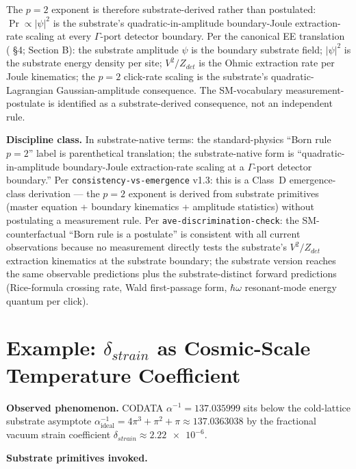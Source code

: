 The $p = 2$ exponent is therefore substrate-derived rather than postulated: $\Pr \propto |\psi|^2$ is the substrate's quadratic-in-amplitude boundary-Joule extraction-rate scaling at every $\Gamma$-port detector boundary. Per the canonical EE translation ( \S 4;  Section B): the substrate amplitude $\psi$ is the boundary substrate field; $|\psi|^2$ is the substrate energy density per site; $V^2/Z_{det}$ is the Ohmic extraction rate per Joule kinematics; the $p = 2$ click-rate scaling is the substrate's quadratic-Lagrangian Gaussian-amplitude consequence. The SM-vocabulary measurement-postulate is identified as a substrate-derived consequence, not an independent rule.

\textbf{Discipline class.} In substrate-native terms: the standard-physics ``Born rule $p=2$'' label is parenthetical translation; the substrate-native form is ``quadratic-in-amplitude boundary-Joule extraction-rate scaling at a $\Gamma$-port detector boundary.'' Per \texttt{consistency-vs-emergence} v1.3: this is a Class~D emergence-class derivation --- the $p = 2$ exponent is derived from substrate primitives (master equation + boundary kinematics + amplitude statistics) without postulating a measurement rule. Per \texttt{ave-discrimination-check}: the SM-counterfactual ``Born rule is a postulate'' is consistent with all current observations because no measurement directly tests the substrate's $V^2/Z_{det}$ extraction kinematics at the substrate boundary; the substrate version reaches the same observable predictions plus the substrate-distinct forward predictions (Rice-formula crossing rate, Wald first-passage form, $\hbar\omega$ resonant-mode energy quantum per click).

\section{Example: $\delta_{strain}$ as Cosmic-Scale Temperature Coefficient}
\label{sec:vol9_app_delta_strain_cosmic_tcc}

\textbf{Observed phenomenon.} CODATA $\alpha^{-1} = 137.035999$ sits below the cold-lattice substrate asymptote $\alpha^{-1}_{\text{ideal}} = 4\pi^3 + \pi^2 + \pi \approx 137.0363038$ by the fractional vacuum strain coefficient $\delta_{strain} \approx \num{2.22e-6}$.

\textbf{Substrate primitives invoked.}

